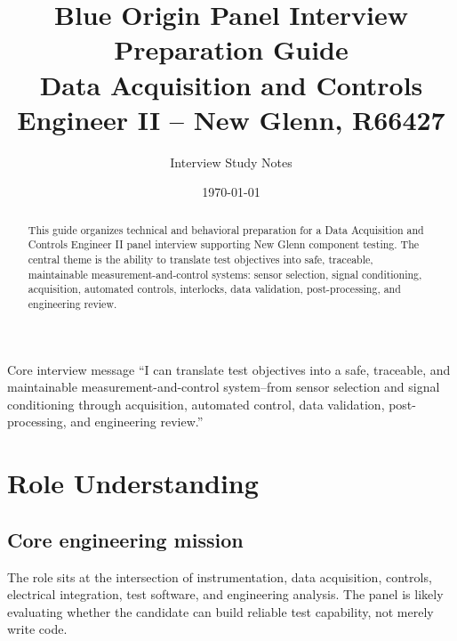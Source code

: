\documentclass[11pt]{article}
\title{\textbf{Blue Origin Panel Interview Preparation Guide}\\
\large Data Acquisition and Controls Engineer II -- New Glenn, R66427}
\author{Interview Study Notes}
\date{\today}
\begin{document}
\maketitle

\begin{abstract}
This guide organizes technical and behavioral preparation for a Data Acquisition
and Controls Engineer II panel interview supporting New Glenn component testing.
The central theme is the ability to translate test objectives into safe,
traceable, maintainable measurement-and-control systems: sensor selection,
signal conditioning, acquisition, automated controls, interlocks, data
validation, post-processing, and engineering review.
\end{abstract}

\begin{keybox}{Core interview message}
``I can translate test objectives into a safe, traceable, and maintainable
measurement-and-control system--from sensor selection and signal conditioning
through acquisition, automated control, data validation, post-processing, and
engineering review.''
\end{keybox}

\tableofcontents
\newpage

\section{Role Understanding}

\subsection{Core engineering mission}
The role sits at the intersection of instrumentation, data acquisition, controls,
electrical integration, test software, and engineering analysis. The panel is
likely evaluating whether the candidate can build reliable test capability, not
merely write code.

\begin{center}
\end{center}
\end{document}
